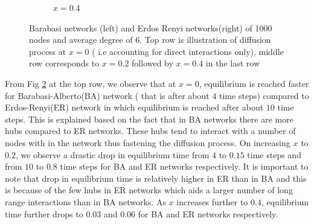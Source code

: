 \documentclass[10pt,a4paper]{article}
\begin{document}
\begin{figure}[H]
\begin{subfigure}[b]{0.45\textwidth}
		\caption{$x=0.4$}
		\label{erdos-x04}
	\end{subfigure}
	\caption{Barabasi networks (left) and Erdos Renyi networks(right) of 1000 nodes and average degree of 6. Top row is illustration of diffusion process at $x=0$ ( i.e accounting for direct interactions only), middle row corresponds to $x=0.2$ followed by $x=0.4$ in the last row}
	\label{barabasi-Erdos-compare}
\end{figure}

From Fig \ref{barabasi-Erdos-compare} at the top row, we observe that at $x=0$, equilibrium is reached faster for Barabasi-Alberto(BA) network ( that is after about $4$ time steps) compared to Erdos-Renyi(ER) network in which equilibrium is reached after about $10$ time steps. This is explained based on the fact that in BA networks there are more hubs compared to ER networks. These hubs tend to interact with a number of nodes with in the network thus fastening the diffusion process. On increasing $x$ to $0.2$, we observe a drastic drop in equilibrium time from  $4$ to $0.15$ time steps and from $10$ to $0.8$ time steps for BA and ER networks respectively. It is important to note that drop in equilibrium time is relatively higher in ER than in BA and this is because of the few hubs in ER networks which aids a larger number of long range interactions than in BA networks. As $x$ increases further to $0.4$, equilibrium time further drops to $0.03$ and $0.06$ for BA and ER networks respectively.
\end{document}
